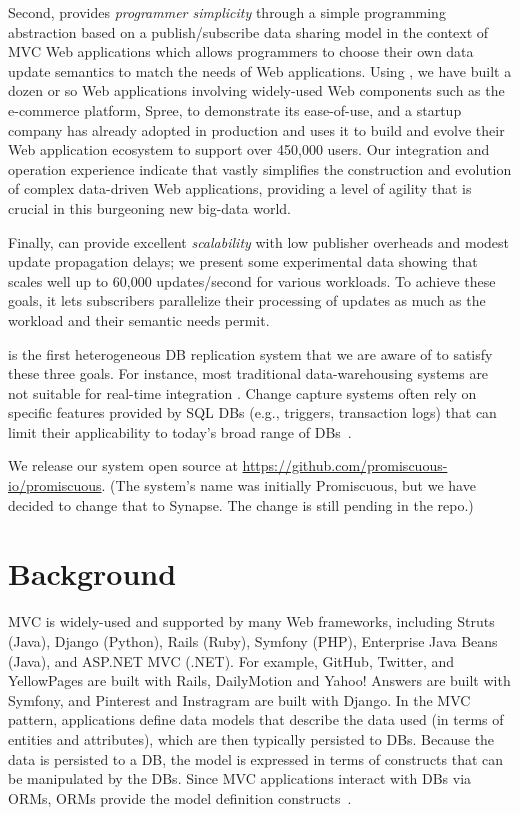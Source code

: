 Second, \synapse provides
\emph{programmer simplicity} through a simple programming abstraction
based on a publish/subscribe data sharing model in the context of MVC
Web applications which allows programmers to choose their own data
update semantics to match the needs of Web applications.  Using
\synapse, we have built a dozen or so Web applications involving
widely-used Web components such as the e-commerce platform, Spree, to demonstrate
its ease-of-use, and a startup company has already adopted
\synapse in production and uses it to build and evolve their Web
application ecosystem to support over 450,000 users.  Our
integration and operation experience indicate that \synapse vastly
simplifies the construction and evolution of complex data-driven Web
applications, providing a level of agility that is crucial in this
burgeoning new big-data world.

Finally, \synapse can provide excellent \emph{scalability} with low publisher
overheads and modest update propagation delays; we present some experimental
data showing that \synapse scales well up to 60,000 updates/second for various
workloads.  To achieve these goals, it lets subscribers parallelize their
processing of updates as much as the workload and their semantic needs
permit.

\synapse is the first heterogeneous DB replication system that we are
aware of to satisfy these three goals.  For instance, most traditional
data-warehousing systems are not suitable for real-time integration
\cite{Chan:1999:DSM:319757.319787,10.1109/TKDE.2005.16,Yang:1997:AMV:645923.673657}.
Change capture systems often rely on specific
features provided by SQL DBs (e.g., triggers, transaction logs) that can
limit their applicability to today's broad range of DBs~\cite{databus}.

We release our system open source at \url{https://github.com/promiscuous-io/promiscuous}.
(The system's name was initially Promiscuous, but we have decided to change that
to Synapse. The change is still pending in the repo.)
\section{Background}
\label{synapse:s:motivation}

MVC is widely-used and supported by many Web
frameworks, including Struts (Java), Django (Python), Rails (Ruby),
Symfony (PHP), Enterprise Java Beans (Java), and ASP.NET MVC (.NET).
For example, GitHub, Twitter, and YellowPages are built with Rails,
DailyMotion and Yahoo! Answers are built with Symfony, and Pinterest
and Instragram are built with Django.
In the MVC pattern, applications define data models that describe the 
data used (in terms of entities and attributes), which are then typically
persisted to DBs.  Because the data is persisted to a DB, the 
model is expressed in terms of constructs that can be manipulated by
the DBs.  Since MVC applications interact with DBs via ORMs, ORMs
provide the model definition constructs~\cite{Barcia:2008aa}.


